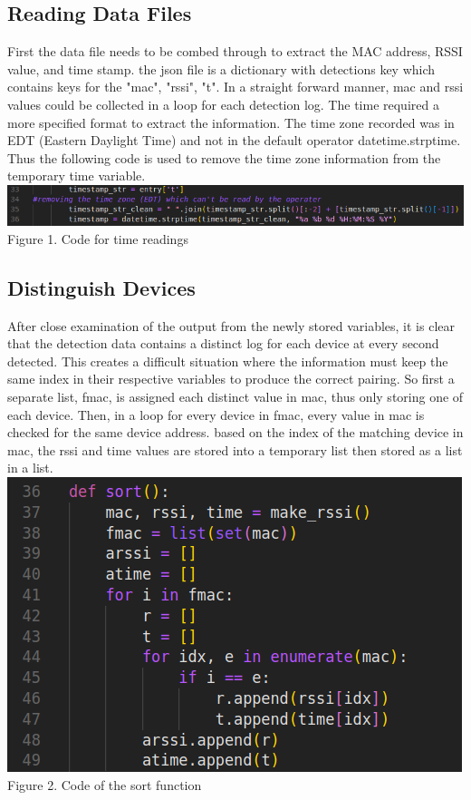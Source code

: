 \documentclass{article}
\begin{document}
\begin{multicols}{2}
\subsection{Reading Data Files}
First the data file needs to be combed through to extract the MAC address, RSSI value, and time stamp. the json file is a dictionary with detections key which contains keys for the "mac", "rssi", "t". In a straight forward manner, mac and rssi values could be collected in a loop for each detection log. The time required a more specified format to extract the information. The time zone recorded was in EDT (Eastern Daylight Time) and not in the default operator datetime.strptime. Thus the following code is used to remove the time zone information from the temporary time variable.
\includegraphics[width=1\linewidth]{make_rssi-code.png}
Figure 1. Code for time readings

\subsection{Distinguish Devices}
After close examination of the output from the newly stored variables, it is clear that the detection data contains a distinct log for each device at every second detected. This creates a difficult situation where the information must keep the same index in their respective variables to produce the correct pairing. So first a separate list, fmac, is assigned each distinct value in mac, thus only storing one of each device. Then, in a loop for every device in fmac, every value in mac is checked for the same device address. based on the index of the matching device in mac, the rssi and time values are stored into a temporary list then stored as a list in a list.
\includegraphics[width=1\linewidth]{sort-function-code.png}
Figure 2. Code of the sort function


\end{multicols}
\end{document}
